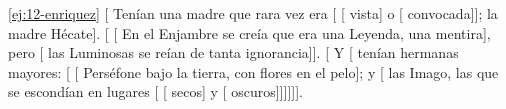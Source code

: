\begin{solucion}{\ref{ej:12-enriquez}}
[ Tenían una madre que rara vez era [ [
vista] o [ convocada]]; la madre Hécate].
[ [ En el Enjambre se creía que era una
Leyenda, una mentira], pero [ las Luminosas se reían
de tanta ignorancia]]. [ Y [ tenían
hermanas mayores: [ [ Perséfone bajo la tierra, con
flores en el pelo]; y [ las Imago, las que se escondían
en lugares [ [ secos] y [
oscuros]]]]]].
\end{solucion}

